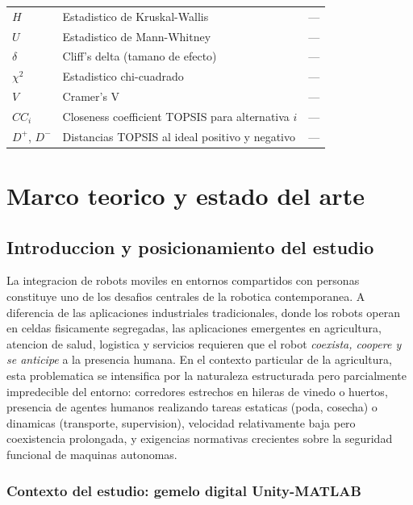 \documentclass[12pt,a4paper,oneside]{book}
\begin{document}
\begin{table}[H]
\begin{tabular}{lll}
$H$              & Estadistico de Kruskal-Wallis & --- \\
$U$              & Estadistico de Mann-Whitney & --- \\
$\delta$         & Cliff's delta (tamano de efecto) & --- \\
$\chi^2$         & Estadistico chi-cuadrado & --- \\
$V$              & Cramer's V & --- \\
$CC_i$           & Closeness coefficient TOPSIS para alternativa $i$ & --- \\
$D^+$, $D^-$     & Distancias TOPSIS al ideal positivo y negativo & --- \\
\bottomrule
\end{tabular}
\end{table}

\newpage

\tableofcontents
\cleardoublepage
\listoftables
\cleardoublepage

\mainmatter

\part{Marco teorico y estado del arte}

\chapter{Introduccion y posicionamiento del estudio}

La integracion de robots moviles en entornos compartidos con personas constituye uno de los desafios centrales de la robotica contemporanea. A diferencia de las aplicaciones industriales tradicionales, donde los robots operan en celdas fisicamente segregadas, las aplicaciones emergentes en agricultura, atencion de salud, logistica y servicios requieren que el robot \emph{coexista, coopere y se anticipe} a la presencia humana. En el contexto particular de la agricultura, esta problematica se intensifica por la naturaleza estructurada pero parcialmente impredecible del entorno: corredores estrechos en hileras de vinedo o huertos, presencia de agentes humanos realizando tareas estaticas (poda, cosecha) o dinamicas (transporte, supervision), velocidad relativamente baja pero coexistencia prolongada, y exigencias normativas crecientes sobre la seguridad funcional de maquinas autonomas.

\section{Contexto del estudio: gemelo digital Unity-MATLAB}
\end{document}
